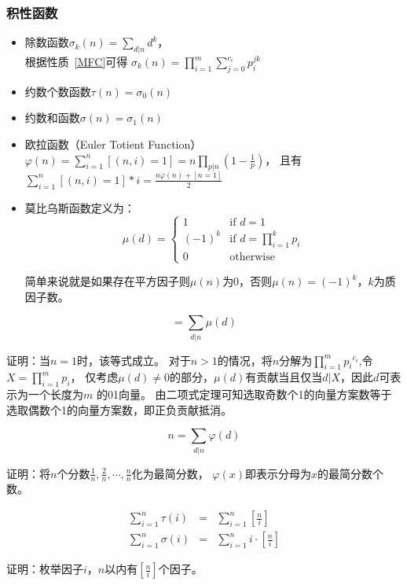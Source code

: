 \subsubsection{积性函数}
\begin{itemize}
	\item 除数函数$\displaystyle \sigma_k(n)=\sum_{d|n}{d^k}$，\\
	      根据性质~\ref{MFC}可得
	      $\displaystyle \sigma_k(n)=\prod_{i=1}^m{\sum_{j=0}^{c_i}{p_i^{jk}}}$
	\item 约数个数函数$\tau(n)=\sigma_0(n)$
	\item 约数和函数$\sigma(n)=\sigma_1(n)$
	\item {}
	      欧拉函数（Euler Totient Function）
	      $\displaystyle \varphi(n)=\sum_{i=1}^n{[(n,i)=1]}=n\prod_{p|n}{(1-\frac{1}{p})}$，
	      且有$\displaystyle \sum_{i=1}^n{[(n,i)=1]*i}=\frac{n\varphi(n)+[n=1]}{2}$
	\item {}
	      莫比乌斯函数定义为：
	      \begin{displaymath}
		      \mu(d)=
		      \left\{
		      \begin{array}{ll}
			      1      & \textrm{if $d=1$}                                \\
			      (-1)^k & \textrm{if $\displaystyle d=\prod_{i=1}^k{p_i}$} \\
			      0      & \textrm{otherwise}
		      \end{array}
		      \right.
	      \end{displaymath}

	      简单来说就是如果存在平方因子则$\mu(n)$为0，否则$\mu(n)=(-1)^k$，$k$为质因子数。
\end{itemize}
\begin{theorem}\label{MobiusT}
	\begin{displaymath}
		[n=1]=\sum_{d|n}{\mu(d)}
	\end{displaymath}
\end{theorem}
证明：当$n=1$时，该等式成立。
对于$n>1$的情况，将$n$分解为$\displaystyle \prod_{i=1}^m{{p_i}^{c_i}}$,令
$\displaystyle X=\prod_{i=1}^m{p_i}$，
仅考虑$\mu(d)\neq 0$的部分，$\mu(d)$有贡献当且仅当$d|X$，因此$d$可表示为一个长度为$m$
的01向量。
由二项式定理可知选取奇数个1的向量方案数等于选取偶数个1的向量方案数，即正负贡献抵消。
\begin{theorem}\label{PhiT}
	\begin{displaymath}
		n=\sum_{d|n}{\varphi(d)}
	\end{displaymath}
\end{theorem}
证明：将$n$个分数$\frac{1}{n},\frac{2}{n},\cdots,\frac{n}{n}$化为最简分数，
$\varphi(x)$即表示分母为$x$的最简分数个数。
\begin{theorem}\label{SigmaT}
	\begin{eqnarray*}
		\sum_{i=1}^n{\tau(i)}&=&\sum_{i=1}^n{[\frac{n}{i}]}\\
		\sum_{i=1}^n{\sigma(i)}&=&\sum_{i=1}^n{i\cdot[\frac{n}{i}]}
	\end{eqnarray*}
\end{theorem}
证明：枚举因子$i$，$n$以内有$[\frac{n}{i}]$个因子。
